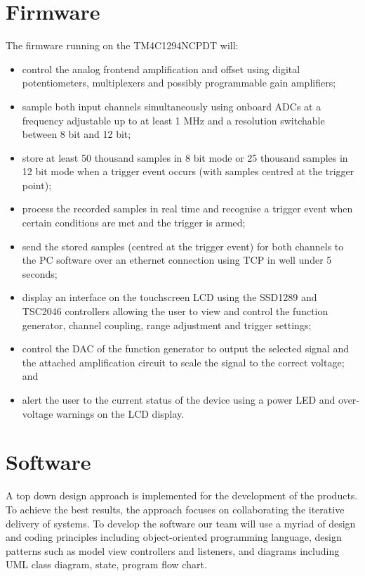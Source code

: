 \documentclass[12pt]{report}
\begin{document}
\section{Firmware}
The firmware running on the TM4C1294NCPDT will:
\begin{itemize}
	\item control the analog frontend amplification and offset using digital potentiometers, multiplexers and possibly programmable gain amplifiers;
	\item sample both input channels simultaneously using onboard ADCs at a frequency adjustable up to at least 1 MHz and a resolution switchable between 8 bit and 12 bit;
	\item store at least 50 thousand samples in 8 bit mode or 25 thousand samples in 12 bit mode when a trigger event occurs (with samples centred at the trigger point);
	\item process the recorded samples in real time and recognise a trigger event when certain conditions are met and the trigger is armed;
	\item send the stored samples (centred at the trigger event) for both channels to the PC software over an ethernet connection using TCP in well under 5 seconds;
	\item display an interface on the touchscreen LCD using the SSD1289 and TSC2046 controllers allowing the user to view and control the function generator, channel coupling, range adjustment and trigger settings;
	\item control the DAC of the function generator to output the selected signal and the attached amplification circuit to scale the signal to the correct voltage; and
	\item alert the user to the current status of the device using a power LED and over-voltage warnings on the LCD display.
\end{itemize}

\section{Software}
A top down design approach is implemented for the development of the products. To achieve the best results, the approach focuses on collaborating the iterative delivery of systems. To develop the software our team will use a myriad of design and coding principles including object-oriented programming language, design patterns such as model view controllers and listeners, and diagrams including UML class diagram, state, program flow chart.
\end{document}
